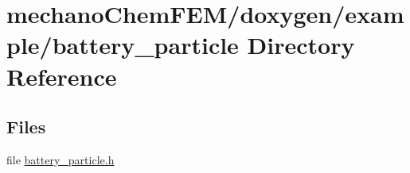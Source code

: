\section{mechano\+Chem\+F\+E\+M/doxygen/example/battery\+\_\+particle Directory Reference}
\label{dir_d622a1529639912cc452c0109f35d8c0}
\subsection*{Files}
\begin{DoxyCompactItemize}
\item 
file \mbox{\hyperlink{battery__particle_8h}{battery\+\_\+particle.\+h}}
\end{DoxyCompactItemize}
